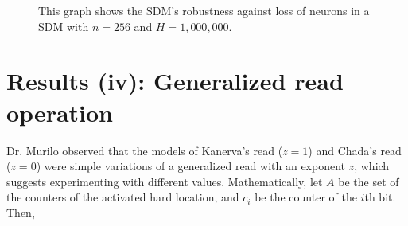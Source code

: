 \begin{figure}[!p]
\centering
{}


\caption{This graph shows the SDM's robustness against loss of neurons in a SDM with $n=256$ and $H=1,000,000$.
\label{fig:sdm-neuron-death-256bits}}
\end{figure}


\chapter{Results (iv): Generalized read operation}

Dr. Murilo observed that the models of Kanerva's read ($z=1$) and Chada's read ($z=0$) were simple variations of a generalized read with an exponent $z$, which suggests experimenting with different values. Mathematically, let $A$ be the set of the counters of the activated hard location, and $c_i$ be the counter of the $i$th bit. Then,

